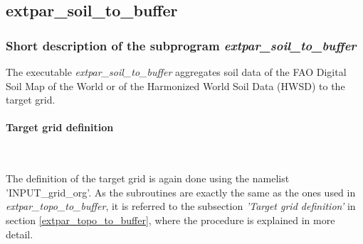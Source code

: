 \documentclass[a4paper,10pt,DIV14,BCOR1cm,titlepage,twoside]{scrartcl}
\begin{document}
\subsection{extpar\_soil\_to\_buffer}\label{extpar_soil_to_buffer}
\subsubsection{Short description of the subprogram \textit{extpar\_soil\_to\_buffer}}
The executable \textit{extpar\_soil\_to\_buffer} aggregates soil data of the FAO Digital Soil Map of the World or of the Harmonized World Soil Data (HWSD) to the target grid.\par\medskip\noindent
\paragraph{Target grid definition} \ \par\medskip\noindent
The definition of the target grid is again done using the namelist 'INPUT\_grid\_org'. As the subroutines are exactly the same as the ones used in \textit{extpar\_topo\_to\_buffer}, it is referred to the subsection \textit{'Target grid definition'} in section \ref{extpar_topo_to_buffer}, where the procedure is explained in more detail. \par\medskip\noindent
\end{document}
